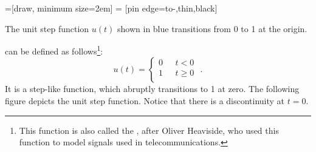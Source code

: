 
=[draw, minimum size=2em]
 = [pin edge={to-,thin,black}]
\begin{marginfigure}[-3cm]
  \begin{center}

  \end{center}
  \caption{The unit step function $u(t)$ shown in blue transitions from 0 to 1 at the origin.}
\end{marginfigure}


 can be defined as
follows\footnote{This function is also called the
  , after Oliver
  Heaviside, who used this function to model signals used in
  telecommunications.}:
\begin{equation}
  u(t) = \left\{\begin{array}{cl}
    0 & ~~~ t < 0   \\
    1 & ~~~ t \ge 0 \\
  \end{array}
  \right. \,\,.
\end{equation}
It is a step-like function, which abruptly transitions to 1 at
zero. The following figure depicts the unit step function. Notice
that there is a discontinuity at $t=0$. %

